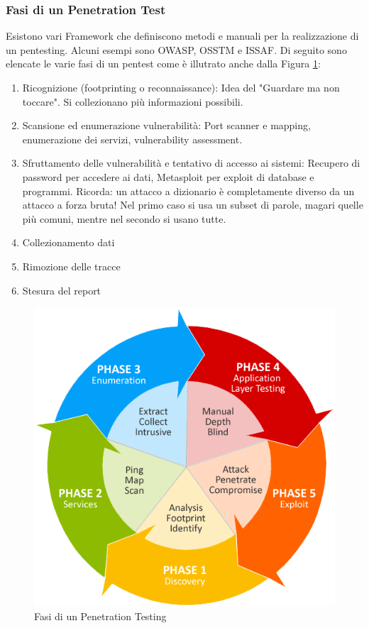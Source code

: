 \subsubsection{Fasi di un Penetration Test}
Esistono vari Framework che definiscono metodi e manuali per la realizzazione di un pentesting. Alcuni esempi sono OWASP, OSSTM e ISSAF. Di seguito sono elencate le varie fasi di un pentest come è illutrato anche dalla Figura \ref{img:pentest_phases}:
\begin{enumerate}
\item Ricognizione (footprinting o reconnaissance): Idea del "Guardare ma non toccare". Si collezionano più informazioni possibili.
\item Scansione ed enumerazione vulnerabilità: Port scanner e mapping, enumerazione dei servizi, vulnerability assessment.
\item Sfruttamento delle vulnerabilità e tentativo di accesso ai sistemi: Recupero di password per accedere ai dati, Metasploit per exploit di database e programmi. Ricorda: un attacco a dizionario è completamente diverso da un attacco a forza bruta! Nel primo caso si usa un subset di parole, magari quelle più comuni, mentre nel secondo si usano tutte.
\item Collezionamento dati
\item Rimozione delle tracce
\item Stesura del report
\end{enumerate}
\begin{figure}[htbp]
	\centering
	\includegraphics[scale = 0.4]{images/pentest_phases}
	\caption{Fasi di un Penetration Testing}
	\label{img:pentest_phases}
\end{figure}

